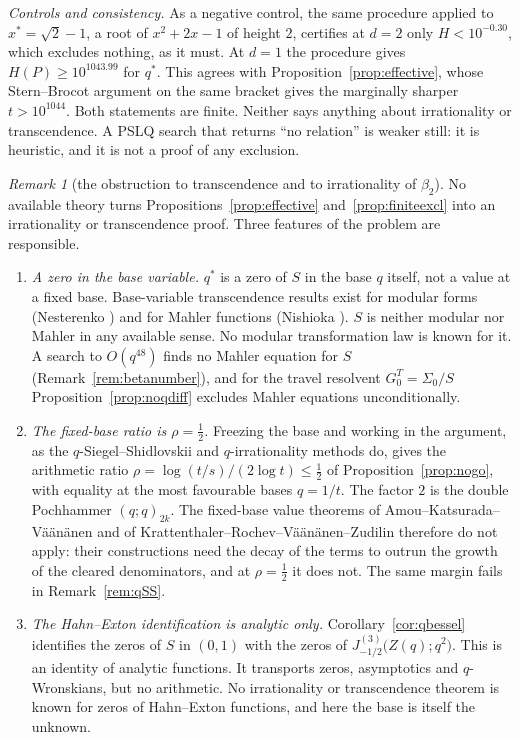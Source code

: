 \documentclass[11pt]{article}
\theoremstyle{plain}
\theoremstyle{definition}
\theoremstyle{remark}
\newtheorem{remark}[theorem]{Remark}
\begin{document}
\noindent\emph{Controls and consistency.} As a negative control, the same procedure applied to
$x^\ast=\sqrt2-1$, a root of $x^2+2x-1$ of height $2$, certifies at $d=2$ only $H<10^{-0.30}$, which
excludes nothing, as it must. At $d=1$ the procedure gives $H(P)\ge10^{1043.99}$ for $q^\ast$. This
agrees with Proposition~\ref{prop:effective}, whose Stern--Brocot argument on the same bracket gives
the marginally sharper $t>10^{1044}$. Both statements are finite. Neither says anything about
irrationality or transcendence. A PSLQ search that returns ``no relation'' is weaker still: it is
heuristic, and it is not a proof of any exclusion.

\begin{remark}[the obstruction to transcendence and to irrationality of $\beta_2$]
\label{rem:betawall}
No available theory turns Propositions~\ref{prop:effective} and~\ref{prop:finiteexcl} into an
irrationality or transcendence proof. Three features of the problem are responsible.
\begin{enumerate}[label=\textup{(\roman*)},leftmargin=2.2em,itemsep=0.1em,topsep=0.2em]
\item \emph{A zero in the base variable.} $q^\ast$ is a zero of $S$ in the base $q$ itself, not a value
at a fixed base. Base-variable transcendence results exist for modular forms (Nesterenko
\cite{Nesterenko1996}) and for Mahler functions (Nishioka \cite{Nishioka1996}). $S$ is neither modular
nor Mahler in any available sense. No modular transformation law is known for it. A search to
$O(q^{48})$ finds no Mahler equation for $S$ (Remark~\ref{rem:betanumber}), and for the travel
resolvent $G^T_0=\Sigma_0/S$ Proposition~\ref{prop:noqdiff} excludes Mahler equations
unconditionally.
\item \emph{The fixed-base ratio is $\rho=\tfrac12$.} Freezing the base and working in the argument,
as the $q$-Siegel--Shidlovskii and $q$-irrationality methods do, gives the arithmetic ratio
$\rho=\log(t/s)/(2\log t)\le\tfrac12$ of Proposition~\ref{prop:nogo}, with equality at the most
favourable bases $q=1/t$. The factor $2$ is the double Pochhammer $(q;q)_{2k}$. The fixed-base value
theorems of Amou--Katsurada--V\"a\"an\"anen \cite{AKV2002} and of
Krattenthaler--Rochev--V\"a\"an\"anen--Zudilin \cite{KRVZ2009} therefore do not apply: their
constructions need the decay of the terms to outrun the growth of the cleared denominators, and at
$\rho=\tfrac12$ it does not. The same margin fails in Remark~\ref{rem:qSS}.
\item \emph{The Hahn--Exton identification is analytic only.} Corollary~\ref{cor:qbessel} identifies
the zeros of $S$ in $(0,1)$ with the zeros of $J^{(3)}_{-1/2}\bigl(Z(q);q^2\bigr)$. This is an
identity of analytic functions. It transports zeros, asymptotics and $q$-Wronskians, but no arithmetic. No irrationality or
transcendence theorem is known for zeros of Hahn--Exton functions, and here the base is itself the
unknown.
\end{enumerate}
\end{remark}
\end{document}
